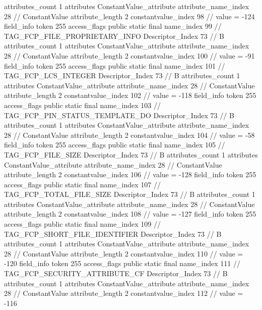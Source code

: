 {{{{{				attributes_count	1
				attributes {
				ConstantValue_attribute {
					attribute_name_index	28		// ConstantValue
					attribute_length	2
					constantvalue_index	98		// value = -124
				}
				}
			}
			field_info {
				token	255
				access_flags	public static final
				name_index	99		// TAG_FCP_FILE_PROPRIETARY_INFO
				Descriptor_Index	73		// B
				attributes_count	1
				attributes {
				ConstantValue_attribute {
					attribute_name_index	28		// ConstantValue
					attribute_length	2
					constantvalue_index	100		// value = -91
				}
				}
			}
			field_info {
				token	255
				access_flags	public static final
				name_index	101		// TAG_FCP_LCS_INTEGER
				Descriptor_Index	73		// B
				attributes_count	1
				attributes {
				ConstantValue_attribute {
					attribute_name_index	28		// ConstantValue
					attribute_length	2
					constantvalue_index	102		// value = -118
				}
				}
			}
			field_info {
				token	255
				access_flags	public static final
				name_index	103		// TAG_FCP_PIN_STATUS_TEMPLATE_DO
				Descriptor_Index	73		// B
				attributes_count	1
				attributes {
				ConstantValue_attribute {
					attribute_name_index	28		// ConstantValue
					attribute_length	2
					constantvalue_index	104		// value = -58
				}
				}
			}
			field_info {
				token	255
				access_flags	public static final
				name_index	105		// TAG_FCP_FILE_SIZE
				Descriptor_Index	73		// B
				attributes_count	1
				attributes {
				ConstantValue_attribute {
					attribute_name_index	28		// ConstantValue
					attribute_length	2
					constantvalue_index	106		// value = -128
				}
				}
			}
			field_info {
				token	255
				access_flags	public static final
				name_index	107		// TAG_FCP_TOTAL_FILE_SIZE
				Descriptor_Index	73		// B
				attributes_count	1
				attributes {
				ConstantValue_attribute {
					attribute_name_index	28		// ConstantValue
					attribute_length	2
					constantvalue_index	108		// value = -127
				}
				}
			}
			field_info {
				token	255
				access_flags	public static final
				name_index	109		// TAG_FCP_SHORT_FILE_IDENTIFIER
				Descriptor_Index	73		// B
				attributes_count	1
				attributes {
				ConstantValue_attribute {
					attribute_name_index	28		// ConstantValue
					attribute_length	2
					constantvalue_index	110		// value = -120
				}
				}
			}
			field_info {
				token	255
				access_flags	public static final
				name_index	111		// TAG_FCP_SECURITY_ATTRIBUTE_CF
				Descriptor_Index	73		// B
				attributes_count	1
				attributes {
				ConstantValue_attribute {
					attribute_name_index	28		// ConstantValue
					attribute_length	2
					constantvalue_index	112		// value = -116
}}}}}}}
